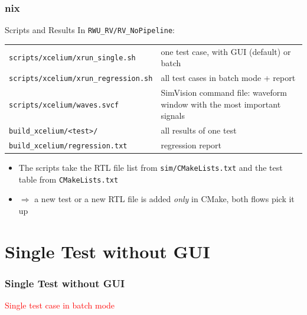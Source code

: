 \documentclass{beamer}
\newcommand{\astitle}{nix}
\newcommand{\assubtitle}{nix}
\newcommand{\cmd}[1]{\texttt{#1}}
\begin{document}
\renewcommand{\assubtitle}{Scripts and Results}
\begin{frame}
\frametitle{\astitle}
\begin{block}{\assubtitle}
  \footnotesize
  In \cmd{RWU\_RV/RV\_NoPipeline}:\\[3pt]
  \begin{tabularx}{\linewidth}{@{}lY@{}}
    \cmd{scripts/xcelium/xrun\_single.sh}     & one test case, with GUI (default) or batch\\[2pt]
    \cmd{scripts/xcelium/xrun\_regression.sh} & all test cases in batch mode + report\\[2pt]
    \cmd{scripts/xcelium/waves.svcf}          & SimVision command file: waveform window with the most important signals\\[2pt]
    \cmd{build\_xcelium/<test>/}              & all results of one test\\[2pt]
    \cmd{build\_xcelium/regression.txt}       & regression report\\
  \end{tabularx}
  \vspace{4pt}
  \begin{itemize}
    \item The scripts take the RTL file list from \cmd{sim/CMakeLists.txt}
      and the test table from \cmd{CMakeLists.txt}
    \item $\Rightarrow$ a new test or a new RTL file is added \emph{only} in CMake,
      both flows pick it up
  \end{itemize}
\end{block}
\end{frame}

\section{Single Test without GUI}
\renewcommand{\astitle}{Single Test without GUI}
\begin{frame}
\frametitle{\astitle}
\textcolor{red}{Single test case in batch mode}
\end{frame}
\end{document}
